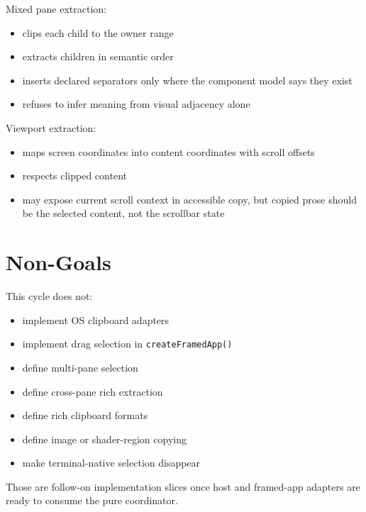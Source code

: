 Mixed pane extraction:

\begin{itemize}
\tightlist
\item
  clips each child to the owner range
\item
  extracts children in semantic order
\item
  inserts declared separators only where the component model says they exist
\item
  refuses to infer meaning from visual adjacency alone
\end{itemize}

Viewport extraction:

\begin{itemize}
\tightlist
\item
  maps screen coordinates into content coordinates with scroll offsets
\item
  respects clipped content
\item
  may expose current scroll context in accessible copy, but copied prose should be the selected content, not the scrollbar state
\end{itemize}

\section{Non-Goals}\label{record-127-non-goals}

This cycle does not:

\begin{itemize}
\tightlist
\item
  implement OS clipboard adapters
\item
  implement drag selection in \texttt{c\allowbreak{}r\allowbreak{}e\allowbreak{}a\allowbreak{}t\allowbreak{}e\allowbreak{}F\allowbreak{}r\allowbreak{}a\allowbreak{}m\allowbreak{}e\allowbreak{}d\allowbreak{}A\allowbreak{}p\allowbreak{}p\allowbreak{}(\allowbreak{})}
\item
  define multi-pane selection
\item
  define cross-pane rich extraction
\item
  define rich clipboard formats
\item
  define image or shader-region copying
\item
  make terminal-native selection disappear
\end{itemize}

Those are follow-on implementation slices once host and framed-app adapters are ready to consume the pure coordinator.

